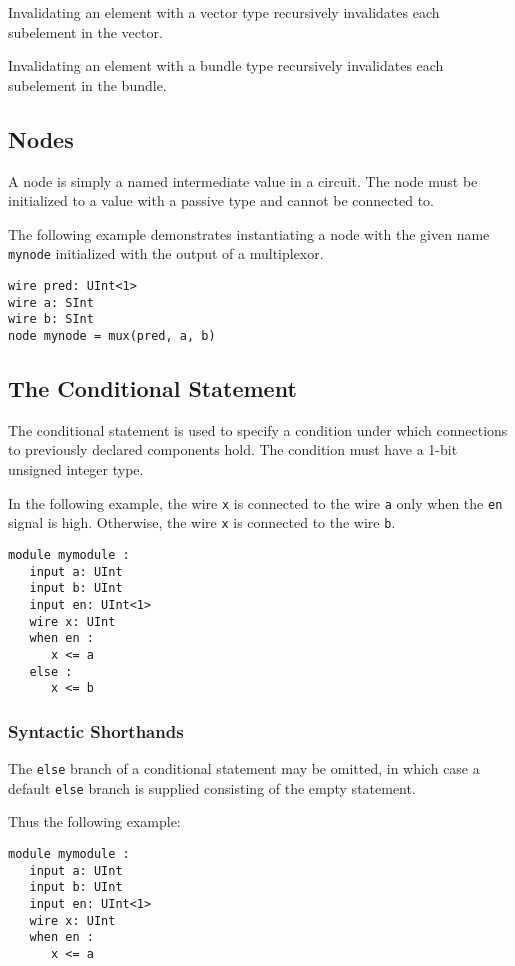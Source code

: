 \documentclass[12pt]{article}
\begin{document}
Invalidating an element with a vector type recursively invalidates each subelement in the vector.

Invalidating an element with a bundle type recursively invalidates each subelement in the bundle.

\subsection{Nodes}
A node is simply a named intermediate value in a circuit. The node must be initialized to a value with a passive type and cannot be connected to. 

The following example demonstrates instantiating a node with the given name \verb|mynode| initialized with the output of a multiplexor. 

\begin{verbatim}
wire pred: UInt<1>
wire a: SInt
wire b: SInt
node mynode = mux(pred, a, b)
\end{verbatim}

\subsection{The Conditional Statement}
The conditional statement is used to specify a condition under which connections to previously declared components hold. The condition must have a 1-bit unsigned integer type.

In the following example, the wire \verb|x| is connected to the wire \verb|a| only when the \verb|en| signal is high. Otherwise, the wire \verb|x| is connected to the wire \verb|b|. 

\begin{verbatim}
module mymodule :
   input a: UInt
   input b: UInt
   input en: UInt<1>
   wire x: UInt
   when en :
      x <= a
   else :
      x <= b  
\end{verbatim}

\subsubsection{Syntactic Shorthands}
The \verb|else| branch of a conditional statement may be omitted, in which case a default \verb|else| branch is supplied consisting of the empty statement.

Thus the following example:

\begin{verbatim}
module mymodule :
   input a: UInt
   input b: UInt
   input en: UInt<1>
   wire x: UInt
   when en :
      x <= a
\end{verbatim}
\end{document}
